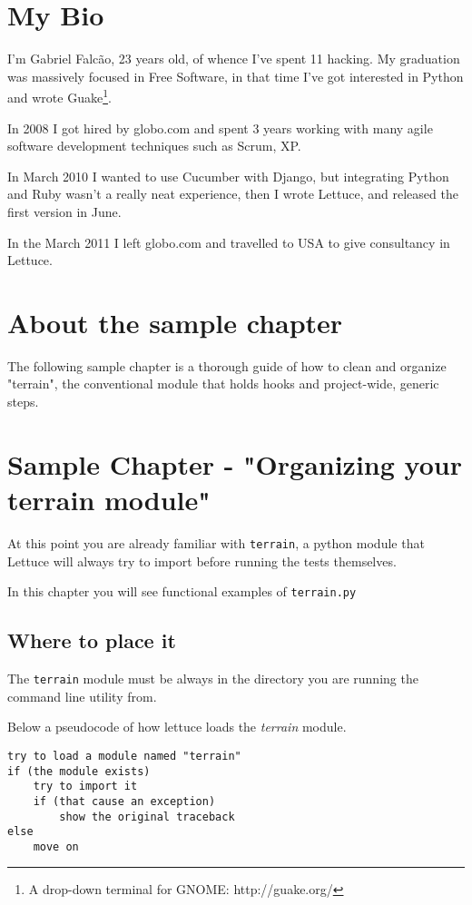 \documentclass[letterpaper]{article}
\begin{document}
\section*{My Bio}

I'm Gabriel Falcão, 23 years old, of whence I've spent 11 hacking. My
graduation was massively focused in Free Software, in that time I've
got interested in Python and wrote Guake\footnote{A drop-down terminal for GNOME: http://guake.org/}.

In 2008 I got hired by globo.com and spent 3 years working with
many agile software development techniques such as Scrum, XP.

In March 2010 I wanted to use Cucumber with Django, but integrating
Python and Ruby wasn't a really neat experience, then I wrote Lettuce,
and released the first version in June.

In the March 2011 I left globo.com and travelled to USA to give
consultancy in Lettuce.

\section*{About the sample chapter}

The following sample chapter is a thorough guide of how to clean and
organize "terrain", the conventional module that holds hooks and
project-wide, generic steps.

\section*{Sample Chapter - "Organizing your terrain module"}

At this point you are already familiar with \texttt{terrain}, a python
module that Lettuce will always try to import before running the tests
themselves.

In this chapter you will see functional examples of \texttt{terrain.py}

\subsection*{Where to place it}

The \texttt{terrain} module must be always in the directory you are
running the command line utility from.

\noindent
Below a pseudocode of how lettuce loads the \textit{terrain} module.

\footnotesize
\begin{verbatim}
try to load a module named "terrain"
if (the module exists)
    try to import it
    if (that cause an exception)
        show the original traceback
else
    move on
\end{verbatim}
\end{document}
